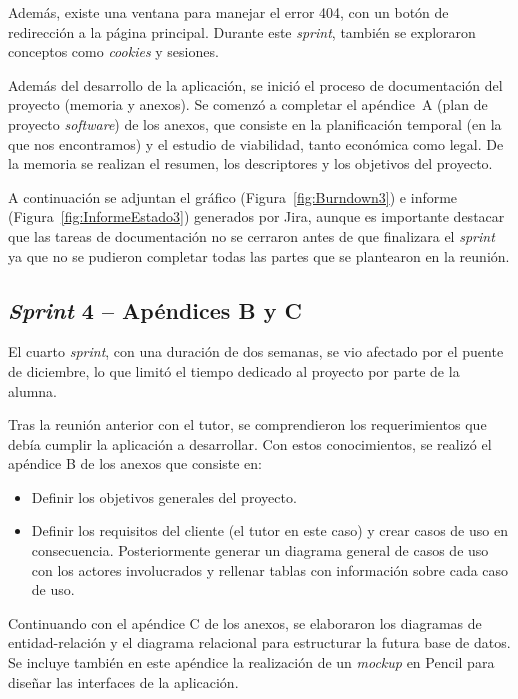 Además, existe una ventana para manejar el error 404, con un botón de redirección a la página principal. Durante este \textit{sprint}, también se exploraron conceptos como \textit{cookies} y sesiones.

Además del desarrollo de la aplicación, se inició el proceso de documentación del proyecto (memoria y anexos). Se comenzó a completar el apéndice~A (plan de proyecto \textit{software}) de los anexos, que consiste en la planificación temporal (en la que nos encontramos) y el estudio de viabilidad, tanto económica como legal.
De la memoria se realizan el resumen, los descriptores y los objetivos del proyecto.

A continuación se adjuntan el gráfico (Figura~\ref{fig:Burndown3}) e informe (Figura~\ref{fig:InformeEstado3}) generados por Jira, aunque es importante destacar que las tareas de documentación no se cerraron antes de que finalizara el \textit{sprint} ya que no se pudieron completar todas las partes que se plantearon en la reunión.


\subsection{\textit{Sprint} 4 – Apéndices B y C}
El cuarto \textit{sprint}, con una duración de dos semanas, se vio afectado por el puente de diciembre, lo que limitó el tiempo dedicado al proyecto por parte de la alumna.

Tras la reunión anterior con el tutor, se comprendieron los requerimientos que debía cumplir la aplicación a desarrollar. Con estos conocimientos, se realizó el apéndice B de los anexos que consiste en:
\begin{itemize}
    \item Definir los objetivos generales del proyecto.
    \item Definir los requisitos del cliente (el tutor en este caso) y crear casos de uso en consecuencia. Posteriormente generar un diagrama general de casos de uso con los actores involucrados y rellenar tablas con información sobre cada caso de uso.
\end{itemize}
Continuando con el apéndice C de los anexos, se elaboraron los diagramas de entidad-relación y el diagrama relacional para estructurar la futura base de datos.
Se incluye también en este apéndice la realización de un \textit{mockup} en Pencil para diseñar las interfaces de la aplicación.

